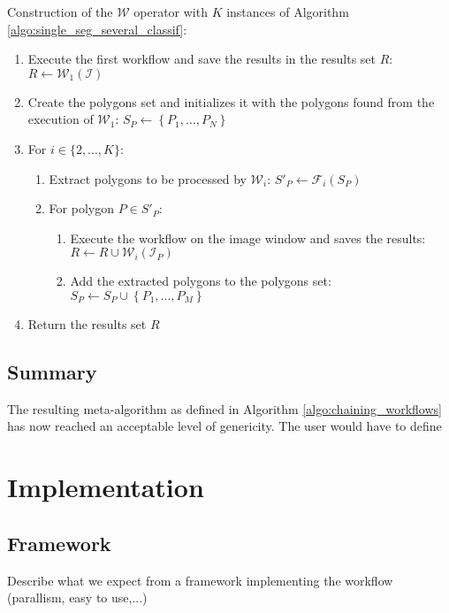 \begin{algorithm} \label{algo:chaining_workflows}
	Construction of the $\mathcal{W}$ operator with $K$ instances of Algorithm \ref{algo:single_seg_several_classif}:

	\begin{enumerate}
		\item Execute the first workflow and save the results in the results set $R$: $R \leftarrow \mathcal{W}_1(\mathcal{I})$
		\item Create the polygons set and initializes it with the polygons found from the execution of $\mathcal{W}_1$: $S_P \leftarrow \left\{P_1, ..., P_N\right\}$
		\item For $i \in \{2, ..., K\}$:
		\begin{enumerate}
			\item Extract polygons to be processed by $\mathcal{W}_i$: $S'_P \leftarrow \mathcal{F}_i(S_P)$
			\item For polygon $P \in S'_P$:
			\begin{enumerate}
				\item Execute the workflow on the image window and saves the results: $R \leftarrow R \cup \mathcal{W}_i(\mathcal{I}_P)$
				\item Add the extracted polygons to the polygons set: $S_P \leftarrow S_P \cup \left\{P_1, ..., P_M\right\}$
			\end{enumerate}
		\end{enumerate}
		\item Return the results set $R$
	\end{enumerate}
\end{algorithm}

\subsection{Summary}
The resulting meta-algorithm as defined in Algorithm \ref{algo:chaining_workflows} has now reached an acceptable level of genericity. The user would have to define


\section{Implementation}
\subsection{Framework}

Describe what we expect from a framework implementing the workflow (parallism, easy to use,...) 

